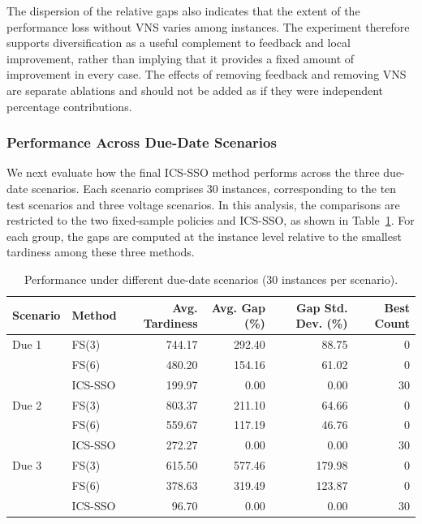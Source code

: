 \documentclass[11pt]{article}
\begin{document}
The dispersion of the relative gaps also indicates that the extent of the performance loss without VNS varies among instances. The experiment therefore supports diversification as a useful complement to feedback and local improvement, rather than implying that it provides a fixed amount of improvement in every case. The effects of removing feedback and removing VNS are separate ablations and should not be added as if they were independent percentage contributions.

\subsubsection{Performance Across Due-Date Scenarios}
\label{subsubsec:due_effect}

We next evaluate how the final ICS-SSO method performs across the three due-date scenarios. Each scenario comprises 30 instances, corresponding to the ten test scenarios and three voltage scenarios. In this analysis, the comparisons are restricted to the two fixed-sample policies and ICS-SSO, as shown in Table~\ref{tab:due_scenario_comparison}. For each group, the gaps are computed at the instance level relative to the smallest tardiness among these three methods.

\begin{table}[H]
\centering
\caption{Performance under different due-date scenarios (30 instances per scenario).}
\label{tab:due_scenario_comparison}
\footnotesize
\setlength{\tabcolsep}{3.2pt}
\begin{tabular}{llrrrr}
\hline
\textbf{Scenario} & \textbf{Method} & \textbf{Avg. Tardiness} & \textbf{Avg. Gap (\%)} & \textbf{Gap Std. Dev. (\%)} & \textbf{Best Count} \\
\hline
Due 1 & FS(3) & 744.17 & 292.40 & 88.75 & 0 \\
 & FS(6) & 480.20 & 154.16 & 61.02 & 0 \\
 & ICS-SSO & 199.97 & 0.00 & 0.00 & 30 \\
\hline
Due 2 & FS(3) & 803.37 & 211.10 & 64.66 & 0 \\
 & FS(6) & 559.67 & 117.19 & 46.76 & 0 \\
 & ICS-SSO & 272.27 & 0.00 & 0.00 & 30 \\
\hline
Due 3 & FS(3) & 615.50 & 577.46 & 179.98 & 0 \\
 & FS(6) & 378.63 & 319.49 & 123.87 & 0 \\
 & ICS-SSO & 96.70 & 0.00 & 0.00 & 30 \\
\hline
\end{tabular}
\end{table}
\end{document}
